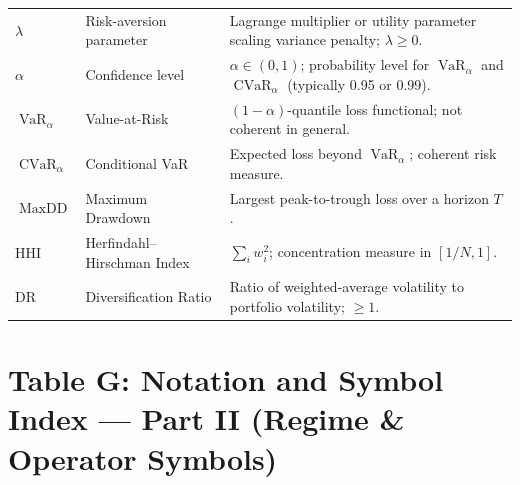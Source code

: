 \documentclass[12pt,openany]{book}
\DeclareMathOperator{\CVaR}{CVaR}
\DeclareMathOperator{\VaR}{VaR}
\DeclareMathOperator{\MaxDD}{MaxDD}
\numberwithin{equation}{chapter}
\theoremstyle{plain}
\theoremstyle{definition}
\theoremstyle{remark}
\begin{document}
{\begin{longtable}{@{} p{3.2cm} p{3.8cm} p{\dimexpr\textwidth-3.2cm-3.8cm-4\tabcolsep\relax} @{}}
\addlinespace
$\lambda$ & Risk-aversion parameter &
  Lagrange multiplier or utility parameter scaling variance penalty;
  $\lambda \ge 0$. \\
\addlinespace
$\alpha$ & Confidence level &
  $\alpha \in (0,1)$; probability level for $\VaR_\alpha$ and
  $\CVaR_\alpha$ (typically 0.95 or 0.99). \\
\addlinespace
$\VaR_\alpha$ & Value-at-Risk &
  $(1-\alpha)$-quantile loss functional; not coherent in general. \\
\addlinespace
$\CVaR_\alpha$ & Conditional VaR &
  Expected loss beyond $\VaR_\alpha$; coherent risk measure. \\
\addlinespace
$\MaxDD$ & Maximum Drawdown &
  Largest peak-to-trough loss over a horizon $T$. \\
\addlinespace
$\mathrm{HHI}$ & Herfindahl--Hirschman Index &
  $\sum_i w_i^2$; concentration measure in $[1/N,1]$. \\
\addlinespace
$\mathrm{DR}$ & Diversification Ratio &
  Ratio of weighted-average volatility to portfolio volatility;
  $\ge 1$. \\
\hline
\end{longtable}
}

\clearpage
\chapter*{Table G: Notation and Symbol Index --- Part II (Regime \& Operator Symbols)}
\end{document}
